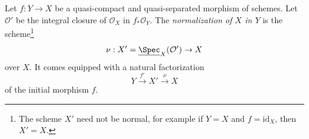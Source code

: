 \begin{definition}
\label{definition-normalization-X-in-Y}
Let $f : Y \to X$ be a quasi-compact and quasi-separated morphism of schemes.
Let $\mathcal{O}'$ be the integral closure of $\mathcal{O}_X$ in
$f_*\mathcal{O}_Y$. The {\it normalization of $X$ in $Y$} is the
scheme\footnote{The scheme $X'$ need not be normal, for example if
$Y = X$ and $f = \text{id}_X$, then $X' = X$.}
$$
\nu : X' = \underline{\Spec}_X(\mathcal{O}') \to X
$$
over $X$. It comes equipped with a natural factorization
$$
Y \xrightarrow{f'} X' \xrightarrow{\nu} X
$$
of the initial morphism $f$.
\end{definition}